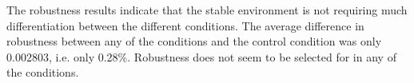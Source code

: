The robustness results indicate that the stable environment is not requiring much differentiation between the different conditions.  The average difference in robustness between any of the conditions and the control condition was only 0.002803, i.e. only 0.28\%. Robustness does not seem to be selected for in any of the conditions. 


